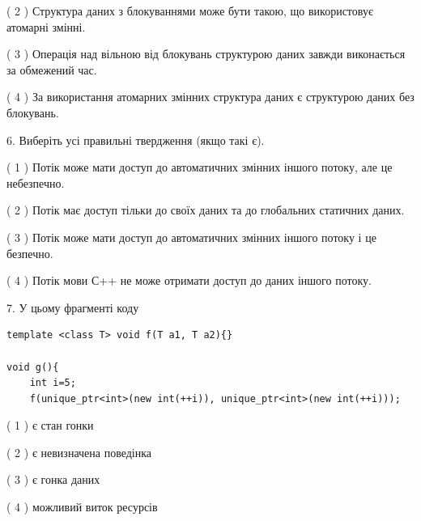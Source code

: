 \documentclass[12pt, ukrainian]{article}
\begin{document}
\begin {large}
{( 2 ) Структура даних з блокуваннями може бути такою, що використовує атомарні змінні.%

( 3 ) Операція над вільною від блокувань структурою даних завжди виконається за обмежений час.%

( 4 ) За використання атомарних змінних структура даних є структурою даних без блокувань.%
\newpage



\vspace{5mm}
6. Виберіть усі правильні твердження (якщо такі є).\par
\vspace{2mm}

( 1 ) Потік може мати доступ до автоматичних змінних іншого потоку, але це небезпечно.%

( 2 ) Потік має доступ тільки до своїх даних та до глобальних статичних даних.%

( 3 ) Потік може мати доступ до автоматичних змінних іншого потоку і це безпечно.%

( 4 ) Потік мови С++ не може отримати доступ до даних іншого потоку.%


\vspace{5mm}
7. У цьому фрагменті коду
\begin{verbatim}
template <class T> void f(T a1, T a2){}

void g(){
    int i=5;
    f(unique_ptr<int>(new int(++i)), unique_ptr<int>(new int(++i)));
\end{verbatim}

( 1 ) є стан гонки%

( 2 ) є невизначена поведінка%

( 3 ) є гонка даних%

( 4 ) можливий виток ресурсів%
}
\end {large}
\end{document}
